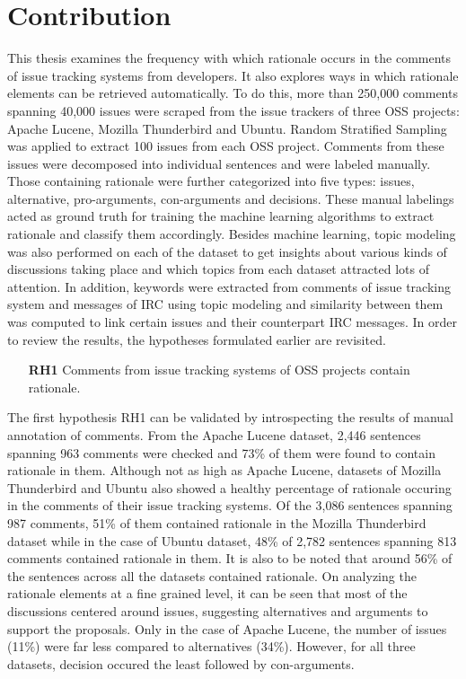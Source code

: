 \documentclass[a4paper,12pt,twoside]{report}
\begin{document}
\section{Contribution}
This thesis examines the frequency with which rationale occurs in the comments of issue tracking systems from developers. It also explores ways in which rationale elements can be retrieved automatically. To do this, more than 250,000 comments spanning 40,000 issues were scraped from the issue trackers of three \acs{OSS} projects: Apache Lucene, Mozilla Thunderbird and Ubuntu. Random Stratified Sampling was applied to extract 100 issues from each OSS project. Comments from these issues were decomposed into individual sentences and were labeled manually. Those containing rationale were further categorized into five types: issues, alternative, pro-arguments, con-arguments and decisions. These manual labelings acted as ground truth for training the machine learning algorithms to extract rationale and classify them accordingly. 
\newline \newline
Besides machine learning, topic modeling was also performed on each of the dataset to get insights about various kinds of discussions taking place and which topics from each dataset attracted lots of attention. In addition, keywords were extracted from comments of issue tracking system and messages of \acs{IRC} using topic modeling and similarity between them was computed to link certain issues and their counterpart \acs{IRC} messages. In order to review the results, the hypotheses formulated earlier are revisited.

\begin{itemize}
\item[\textbf{RH1}] Comments from issue tracking systems of \acs{OSS} projects contain rationale.
\end{itemize}
The first hypothesis RH1 can be validated by introspecting the results of manual annotation of comments. From the Apache Lucene dataset, 2,446 sentences spanning 963 comments were checked and 73\% of them were found to contain rationale in them. Although not as high as Apache Lucene, datasets of Mozilla Thunderbird and Ubuntu also showed a healthy percentage of rationale occuring in the comments of their issue tracking systems. Of the 3,086 sentences spanning 987 comments, 51\% of them contained rationale in the Mozilla Thunderbird dataset while in the case of Ubuntu dataset, 48\% of 2,782 sentences spanning 813 comments contained rationale in them. It is also to be noted that around 56\% of the sentences across all the datasets contained rationale. On analyzing the rationale elements at a fine grained level, it can be seen that most of the discussions centered around issues, suggesting alternatives and arguments to support the proposals. Only in the case of Apache Lucene, the number of issues (11\%) were far less compared to alternatives (34\%). However, for all three datasets, decision occured the least followed by con-arguments. 
\end{document}

